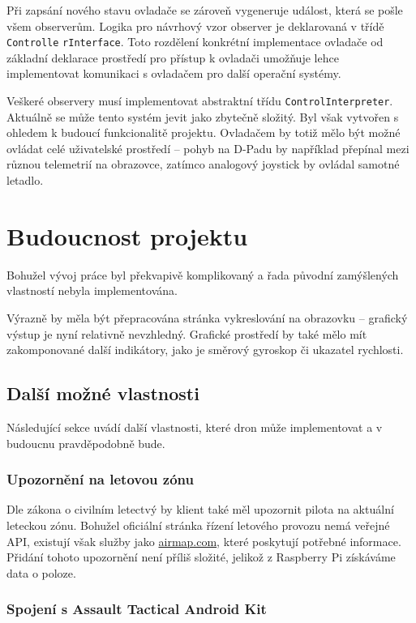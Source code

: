 \documentclass[a4paper,oneside,12pt]{report}
\begin{document}
Při zapsání nového stavu ovladače se zároveň vygeneruje událost, která se pošle všem observerům.
Logika pro návrhový vzor observer je deklarovaná v třídě \verb|Controlle|
\verb|rInterface|.
Toto rozdělení konkrétní implementace ovladače od základní deklarace prostředí pro přístup k ovladači umožňuje lehce implementovat komunikaci s ovladačem pro další operační systémy.

Veškeré observery musí implementovat abstraktní třídu \verb|ControlInterpreter|.
Aktuálně se může tento systém jevit jako zbytečně složitý.
Byl však vytvořen s ohledem k budoucí funkcionalitě projektu.
Ovladačem by totiž mělo být možné ovládat celé uživatelské prostředí -- pohyb na D-Padu by například přepínal mezi různou telemetrií na obrazovce, zatímco analogový joystick by ovládal samotné letadlo.

\chapter{Budoucnost projektu}

Bohužel vývoj práce byl překvapivě komplikovaný a řada původní zamýšlených vlastností nebyla implementována.

Výrazně by měla být přepracována stránka vykreslování na obrazovku -- grafický výstup je nyní relativně nevzhledný.
Grafické prostředí by také mělo mít zakomponované další indikátory, jako je směrový gyroskop či ukazatel rychlosti.

\section{Další možné vlastnosti}

Následující sekce uvádí další vlastnosti, které dron může implementovat a v budoucnu pravděpodobně bude.

\subsection{Upozornění na letovou zónu}
Dle zákona o civilním letectvý by klient také měl upozornit pilota na aktuální leteckou zónu.
Bohužel oficiální stránka řízení letového provozu nemá veřejné API, existují však služby jako \url{airmap.com}, které poskytují potřebné informace.
Přidání tohoto upozornění není příliš složité, jelikož z Raspberry Pi získáváme data o poloze.

\subsection{Spojení s Assault Tactical Android Kit}
\end{document}
